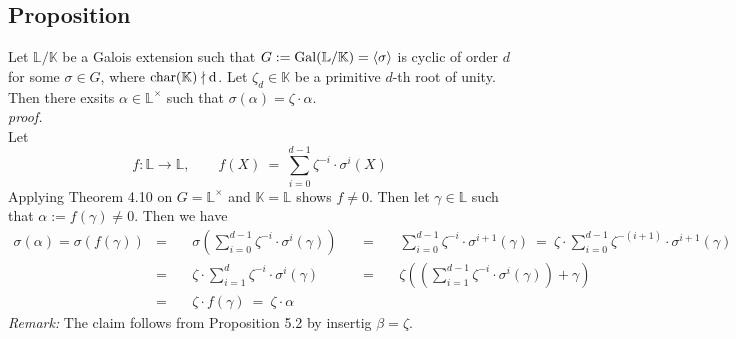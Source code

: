 \documentclass[12pt]{book}
\begin{document}
\begin{spacing}{1.3}
\subsection{Proposition} %
Let $\mathbb{L}/\mathbb{K}$ be a Galois extension such that $G:= \rm{Gal}(\mathbb{L}/\mathbb{K})=\langle \sigma \rangle$ is cyclic of order $d$ for some $\sigma \in G$, where $\rm{char}(\mathbb{K}) \nmid d$. Let $\zeta_d \in \mathbb{K}$ be a primitive $d$-th root of unity.\\
Then there exsits $\alpha \in \mathbb{L}^{\times}$ such that $\sigma(\alpha)=\zeta \cdot \alpha$.\\
\textit{proof.}\\
Let $$f:\mathbb{L} \longrightarrow \mathbb{L}, \qquad f(X)\ =\ \sum_{i=0}^{d-1} \zeta^{-i} \cdot \sigma^{i}(X)$$
Applying Theorem 4.10 on $G=\mathbb{L}^{\times}$ and $\mathbb{K}=\mathbb{L}$ shows $f\neq 0$.
Then let $\gamma \in \mathbb{L}$ such that $\alpha:=f(\gamma) \neq 0$. Then we have
\begin{alignat*}{13}
\sigma(\alpha)=\sigma \left(f(\gamma)\right) &=&& \ \sigma \left(\sum_{i=0}^{d-1} \zeta^{-i} \cdot \sigma^{i}(\gamma)\right) \ &&=&&\ \sum_{i=0}^{d-1} \zeta^{-i} \cdot \sigma^{i+1}(\gamma)\ =\ \zeta \cdot \sum_{i=0}^{d-1}\zeta^{-(i+1)}\cdot \sigma^{i+1}(\gamma)\\
&= && \ \zeta \cdot \sum_{i=1}^d \zeta^{-i} \cdot \sigma^{i}(\gamma) \ &&= &&\ \zeta \left(\left(\sum_{i=1}^{d-1}\zeta^{-i} \cdot \sigma^{i}(\gamma)\right)+\gamma \right)  \\
&=&&\ \zeta \cdot f(\gamma) \ =\ \zeta \cdot \alpha 
\end{alignat*}
\textit{Remark:} The claim follows from Proposition 5.2 by insertig $\beta=\zeta$. 


\end{spacing}
\end{document}
